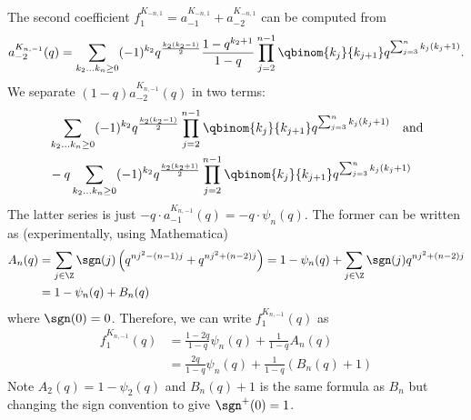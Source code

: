 \documentclass[11pt,e-only]{amsart}
\begin{document}
The second coefficient $f_1^{K_{-n,1}}= a_{-1}^{K_{-n,1}}+a_{-2}^{K_{-n,1}}$ can be computed from
\begin{equation}
    a_{-2}^{K_{n,-1}}(q)= \sum_{k_2\dots k_n\geq 0} (-1)^{k_2} q^{\frac{k_2(k_2-1)}{2}}\frac{1-q^{k_2+1}}{1-q}\prod_{j=2}^{n-1} \qbinom{k_j}{k_{j+1}} q^{\sum_{j=3}^{n} k_j(k_j+1)}.
\end{equation}
We separate $(1-q)a_{-2}^{K_{n,-1}}(q)$ in two terms:
\begin{equation}
\begin{split}
    &\sum_{k_2\dots k_n\geq 0} (-1)^{k_2} q^{\frac{k_2(k_2-1)}{2}}\prod_{j=2}^{n-1} \qbinom{k_j}{k_{j+1}} q^{\sum_{j=3}^{n} k_j(k_j+1)} \quad \text{and}\\
    &-q\sum_{k_2\dots k_n\geq 0} (-1)^{k_2} q^{\frac{k_2(k_2+1)}{2}}\prod_{j=2}^{n-1} \qbinom{k_j}{k_{j+1}} q^{\sum_{j=3}^{n} k_j(k_j+1)}
\end{split}
\end{equation}
The latter series is just $-q\cdot a_{-1}^{K_{n,-1}}(q) = -q\cdot \psi_n(q)$. The former can be written as (experimentally, using Mathematica)
\begin{equation}
\begin{split}
    A_n(q)&=\sum_{j\in \Z} \sgn(j)\left(q^{n j^2-(n-1)j}+q^{n j^2+(n-2)j}\right) = 1-\psi_n(q)+\sum_{j\in \Z} \sgn(j)q^{n j^2+(n-2)j} \\ &=1-\psi_n(q)+B_n(q)
\end{split}
\end{equation}
where $\sgn(0)=0$. Therefore, we can write $f_1^{K_{n,-1}}(q)$ as
\begin{equation}
\begin{split}
    f_1^{K_{n,-1}}(q) &= \frac{1-2q}{1-q}\psi_n(q)+\frac{1}{1-q}A_n(q) \\& =\frac{2q}{1-q}\psi_n(q)+\frac{1}{1-q}\left(B_n(q)+1\right)
\end{split}
\end{equation}
Note $A_2(q)=1-\psi_2(q)$ and $B_n(q)+1$ is the same formula as $B_n$ but changing the sign convention to give $\sgn^+(0)=1$.

\end{document}
